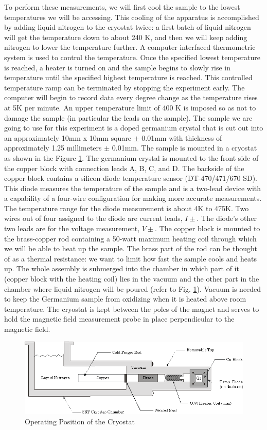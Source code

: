 \documentclass{../lab}
\begin{document}
To perform these measurements, we will first cool the sample to the lowest temperatures we will be accessing. This cooling of the apparatus is accomplished by adding liquid nitrogen to the cryostat twice: a first batch of liquid nitrogen will get the temperature down to about 240 K, and then we will keep adding nitrogen to lower the temperature further. A computer interfaced thermometric system is used to control the temperature. Once the specified lowest temperature is reached, a heater is turned on and the sample begins to slowly rise in temperature until the specified highest temperature is reached. This controlled temperature ramp can be terminated by stopping the experiment early. The computer will begin to record data every degree change as the temperature rises at 5K per minute. An upper temperature limit of 400 K is imposed so as not to damage the sample (in particular the leads on the sample). The sample we are going to use for this experiment is a doped germanium crystal that is cut out into an approximately 10mm x 10mm square $\pm$ 0.01mm with thickness of approximately 1.25 millimeters $\pm$ 0.01mm. The sample is mounted in a cryostat as shown in the Figure \ref{fig:cryostat}. The germanium crystal is mounted to the front side of the copper block with connection leads A, B, C, and D. The backside of the copper block contains a silicon diode temperature sensor (DT-470/471/670 SD). This diode measures the temperature of the sample and is a two-lead device with a capability of a four-wire configuration for making more accurate measurements. The temperature range for the diode measurement is about 4K to 475K. Two wires out of four assigned to the diode are current leads, $I\pm$. The diode's other two leads are for the voltage measurement, $V\pm$. The copper block is mounted to the brass-copper rod containing a 50-watt maximum heating coil through which we will be able to heat up the sample. The brass part of the rod can be thought of as a thermal resistance: we want to limit how fast the sample cools and heats up. The whole assembly is submerged into the chamber in which part of it (copper block with the heating coil) lies in the vacuum and the other part in the chamber where liquid nitrogen will be poured (refer to Fig. \ref{fig:cryostat}). Vacuum is needed to keep the Germanium sample from oxidizing when it is heated above room temperature. The cryostat is kept between the poles of the magnet and serves to hold the magnetic field measurement probe in place perpendicular to the magnetic field.

\begin{figure}[h]
    \centering
    \includegraphics[width=0.8\linewidth]{images/Cryostat.png}
    \caption{Operating Position of the Cryostat}
    \label{fig:cryostat}
\end{figure}
\end{document}
